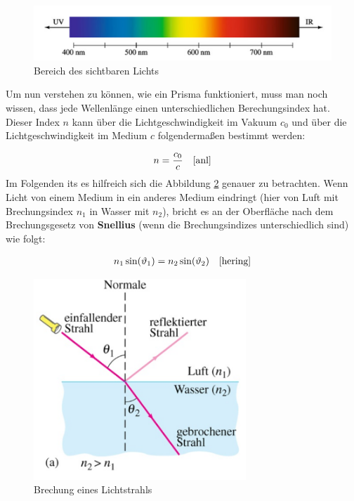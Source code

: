 \documentclass[a4paper]{scrartcl}
\numberwithin{equation}{subsection}
\begin{document}
\begin{figure}[H]
	\includegraphics[width=12cm]{Abbildungen/sichtbaresLicht}
	\centering
	\caption{Bereich des sichtbaren Lichts \cite{anl}}
	\centering
	\label{fig:sichtbaresLicht}
\end{figure}

Um nun verstehen zu können, wie ein Prisma funktioniert, muss man noch wissen, dass jede Wellenlänge einen unterschiedlichen Berechungsindex hat.
Dieser Index $n$ kann über die Lichtgeschwindigkeit im Vakuum $c_0$ und über die Lichtgeschwindigkeit im Medium $c$ folgendermaßen bestimmt werden:

\begin{align}
	n = \frac{c_0}{c} \quad \cite{anl}
\end{align}
\newpage
Im Folgenden its es hilfreich sich die Abbildung \ref{fig:Brechung} genauer zu betrachten.
Wenn Licht von einem Medium in ein anderes Medium eindringt (hier von Luft mit Brechungsindex $n_1$ in Wasser mit $n_2$), bricht es an der Oberfläche nach dem Brechungsgesetz von \textbf{Snellius} (wenn die Brechungsindizes unterschiedlich sind) wie folgt:

\begin{align}
	n_1\sin(\vartheta_1) = n_2\sin(\vartheta_2)\quad \cite{hering}
\end{align}

\begin{figure}[H]
	\includegraphics[width=8cm]{Abbildungen/Brechung}
	\centering
	\caption{Brechung eines Lichtstrahls \cite{anl}}
	\centering
	\label{fig:Brechung}
\end{figure}
\end{document}
